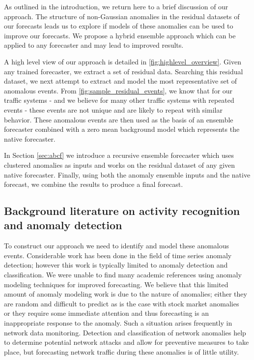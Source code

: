 As outlined in the introduction, we return here to a brief discussion of our approach.  The structure of non-Gaussian anomalies in the residual datasets of our forecasts leads us to explore if models of these anomalies can be used to improve our forecasts.  We propose a hybrid ensemble approach which can be applied to any forecaster and may lead to improved results.  

A high level view of our approach is detailed in \ref{fig:highlevel_overview}.  Given any trained forecaster, we extract a set of residual data.  Searching this residual dataset, we next attempt to extract and model the most representative set of anomalous events.  From \ref{fig:sample_residual_events}, we know that for our traffic systems - and we believe for many other traffic systems with repeated events - these events are not unique and are likely to repeat with similar behavior.  These anomalous events are then used as the basis of an ensemble forecaster combined with a zero mean background model which represents the native forecaster.  

In Section \ref{sec:abcf} we introduce a recursive ensemble forecaster which uses clustered anomalies as inputs and works on the residual dataset of any given native forecaster.  Finally, using both the anomaly ensemble inputs and the native forecast, we combine the results to produce a final forecast.  


\subsection{Background literature on activity recognition and anomaly detection}
To construct our approach we need to identify and model these anomalous events.  Considerable work has been done in the field of time series anomaly detection; however this work is typically limited to anomaly detection and classification.  We were unable to find many academic references using anomaly modeling techniques for improved forecasting.  We believe that this limited amount of anomaly modeling work is due to the nature of anomalies; either they are random and difficult to predict as is the case with stock market anomalies ~\cite{Kontonikas2013, Thushara2014} or they require some immediate attention and thus forecasting is an inappropriate response to the anomaly.  Such a situation arises frequently in network data monitoring.  Detection and classification of network anomalies help to determine potential network attacks \cite{Tartakovsky2013, Gogoi2011} and allow for preventive measures to take place, but forecasting network traffic during these anomalies is of little utility.  
   
